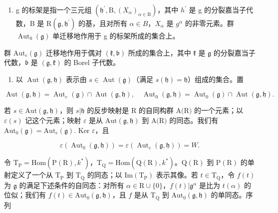 \begin{enumerate}
\def\labelenumi{\arabic{enumi})}
\setcounter{enumi}{16}
\tightlist
\item
  g 的标架是指一个三元组 \((\mathfrak{h}^{\prime},\mathrm{B},(X_{\alpha})_{\alpha\in\mathrm{B}})\)，其中 \(h^{\prime}\) 是 g 的分裂嘉当子代数，B 是 \(\mathrm{R}(\mathfrak{g},\mathfrak{h}^{\prime})\) 的基，且对所有 \(\alpha\in B\)，\(X_{\alpha}\) 是 \(g^{\alpha}\) 的非零元素。群 \(\operatorname{Aut}_{0}(\mathfrak{g})\) 单迁移地作用于 g 的标架所成的集合上。
\end{enumerate}

群 \(\mathrm{Aut}_e(\mathfrak{g})\) 迁移地作用于偶对 \((\mathfrak{k},\mathfrak{b})\) 所成的集合上，其中 \(\mathfrak{k}\) 是 \(\mathfrak{g}\) 的分裂嘉当子代数，\(\mathfrak{b}\) 是 \((\mathfrak{g},\mathfrak{k})\) 的 Borel 子代数。

\begin{enumerate}
\def\labelenumi{\arabic{enumi})}
\setcounter{enumi}{17}
\tightlist
\item
  以 \(\operatorname{Aut}(\mathfrak{g},\mathfrak{h})\) 表示由 \(s\in \operatorname{Aut}(\mathfrak{g})\)（满足 \(s(\mathfrak{h}) = \mathfrak{h}\)）组成的集合。置
\end{enumerate}

\[
\operatorname{Aut} (\mathfrak {g}, \mathfrak {h}) = \operatorname{Aut} _ {e} (\mathfrak {g}) \cap \operatorname{Aut} (\mathfrak {g}, \mathfrak {h}), \quad \operatorname{Aut} _ {0} (\mathfrak {g}, \mathfrak {h}) = \operatorname{Aut} _ {0} (\mathfrak {g}) \cap \operatorname{Aut} (\mathfrak {g}, \mathfrak {h}).
\]

若 \(s \in \text{Aut}(\mathfrak{g}, \mathfrak{h})\)，则 \(s | \mathfrak{h}\) 的反步映射是 R 的自同构群 \(\text{A(R)}\) 的一个元素；以 \(\varepsilon(s)\) 记这个元素；映射 \(\varepsilon\) 是从 \(\text{Aut}(\mathfrak{g}, \mathfrak{h})\) 到 \(\text{A(R)}\) 的同态。我们有 \(\text{Aut}_{0}(\mathfrak{g}) = \text{Aut}_{e}(\mathfrak{g})\). Ker \(\varepsilon\)，且

\[
\varepsilon (\operatorname{Aut} _ {0} (\mathfrak {g}, \mathfrak {h})) = \varepsilon (\operatorname{Aut} _ {e} (\mathfrak {g}, \mathfrak {h})) = W.
\]

令 \(\mathrm{T}_{\mathrm{P}} = \mathrm{Hom}(\mathrm{P}(\mathrm{R}), k^{*})\)，\(\mathrm{T}_{\mathrm{Q}} = \mathrm{Hom}(\mathrm{Q}(\mathrm{R}), k^{*})\)。\(\mathrm{Q}(\mathrm{R})\) 到 \(\mathrm{P}(\mathrm{R})\) 的单射定义了一个从 \(\mathrm{T}_{\mathrm{P}}\) 到 \(\mathrm{T}_{\mathrm{Q}}\) 的同态；以 \(\mathrm{Im}(\mathrm{T}_{\mathrm{P}})\) 表示其像。若 \(t \in \mathrm{T}_{\mathrm{Q}}\)，令 \(f(t)\) 为 \(\mathfrak{g}\) 的满足下述条件的自同态：对所有 \(\alpha \in \mathrm{R} \cup \{0\}\)，\(f(t)|\mathfrak{g}^{\alpha}\) 是比为 \(t(\alpha)\) 的位似；我们有 \(f(t)\in \mathrm{Aut}_{0}(\mathfrak{g},\mathfrak{h})\)，且 \(f\) 是从 \(\mathrm{T}_{\mathrm{Q}}\) 到 \(\mathrm{Aut}_0(\mathfrak{g},\mathfrak{h})\) 的单同态。序列

